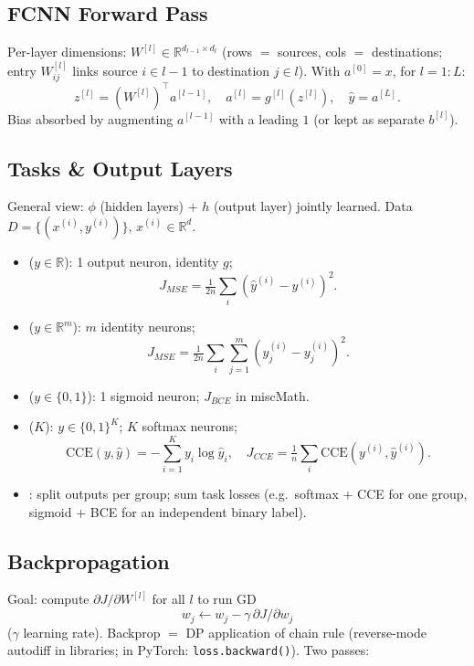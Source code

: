 \subsection{FCNN Forward Pass}
Per-layer dimensions: $W^{[l]}\!\in\!\mathbb{R}^{d_{l-1}\times d_l}$ (rows $=$ sources, cols $=$ destinations; entry $W^{[l]}_{ij}$ links source $i\!\in\!l{-}1$ to destination $j\!\in\!l$). With $a^{[0]}{=}x$, for $l{=}1{:}L$:
\[z^{[l]}=(W^{[l]})^{\top}a^{[l-1]},\quad a^{[l]}=g^{[l]}(z^{[l]}),\quad \hat y=a^{[L]}.\]
Bias absorbed by augmenting $a^{[l-1]}$ with a leading $1$ (or kept as separate $b^{[l]}$).

\subsection{Tasks \& Output Layers}
General view:  $\phi$ (hidden layers) $+$  $h$ (output layer) jointly learned. Data $D{=}\{(x^{(i)},y^{(i)})\}$, $x^{(i)}\!\in\!\mathbb{R}^{d}$.
\begin{itemize}
\item {} ($y\!\in\!\mathbb{R}$): 1 output neuron, identity $g$;
\[J_{MSE}=\tfrac1{2n}\sum_i(\hat y^{(i)}-y^{(i)})^2.\]
\item {} ($y\!\in\!\mathbb{R}^m$): $m$ identity neurons;
\[J_{MSE}=\tfrac1{2n}\sum_i\sum_{j=1}^{m}(\hat y^{(i)}_j-y^{(i)}_j)^2.\]
\item {} ($y\!\in\!\{0,1\}$): 1 sigmoid neuron; $J_{BCE}$ in miscMath.
\item {} ($K$):  $y\!\in\!\{0,1\}^K$; $K$ softmax neurons; 
\[\mathrm{CCE}(y,\hat y)=-\sum_{i=1}^{K}y_i\log\hat y_i,\quad J_{CCE}=\tfrac1n\sum_i\mathrm{CCE}(y^{(i)},\hat y^{(i)}).\]
\item {}: split outputs per group; sum task losses (e.g.\ softmax $+$ CCE for one group, sigmoid $+$ BCE for an independent binary label).
\end{itemize}

\subsection{Backpropagation}
Goal: compute $\partial J/\partial W^{[l]}$ for all $l$ to run GD
\[w_j\leftarrow w_j-\gamma\,\partial J/\partial w_j\]
($\gamma$ learning rate). Backprop $=$ DP application of chain rule (reverse-mode autodiff in libraries; in PyTorch: \texttt{loss.backward()}). Two passes:
